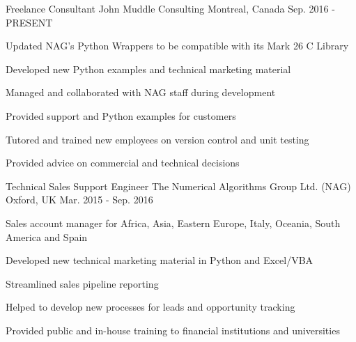 

\begin{cventries}

  \cventry
    {Freelance Consultant} %
    {John Muddle Consulting} %
    {Montreal, Canada} %
    {Sep. 2016 - PRESENT} %
    {
      \begin{cvitems} %
        \item {Updated\/ NAG's Python Wrappers to be compatible with its Mark 26 C Library}
        \item {Developed new Python examples and technical marketing material}
        \item {Managed and collaborated with NAG staf\/f during development}
        \item {Provided support and Python examples for customers}
       \item{Tutored and trained new employees on version control and unit testing}
       \item{Provided advice on commercial and technical decisions}
      \end{cvitems}
    }

  \cventry
    {Technical Sales Support Engineer} %
    {The Numerical Algorithms Group Ltd. (NAG)} %
    {Oxford, UK} %
    {Mar. 2015 - Sep. 2016} %
    {
      \begin{cvitems} %
        \item {Sales account manager for Africa, Asia, Eastern Europe, Italy, Oceania, South America and Spain}
        \item {Developed new technical marketing material in Python and Excel/VBA}
        \item {Streamlined sales pipeline reporting}
        \item {Helped to develop new processes for leads and opportunity tracking}
        \item {Provided public and in-house training to financial institutions and universities}
      \end{cvitems}
    }
    

\end{cventries}

